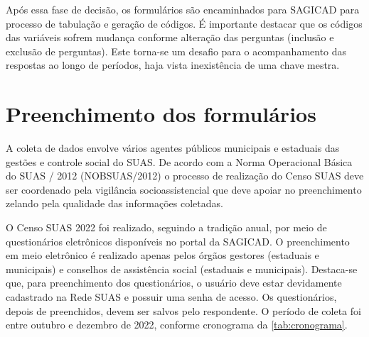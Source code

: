 \documentclass[
  brazilian]{report}
\begin{document}
Após essa fase de decisão, os formulários são encaminhados para SAGICAD
para processo de tabulação e geração de códigos. É importante destacar
que os códigos das variáveis sofrem mudança conforme alteração das
perguntas (inclusão e exclusão de perguntas). Este torna-se um desafio
para o acompanhamento das respostas ao longo de períodos, haja vista
inexistência de uma chave mestra.

\hypertarget{preenchimento-dos-formuluxe1rios}{%
\section{Preenchimento dos
formulários}\label{preenchimento-dos-formuluxe1rios}}

A coleta de dados envolve vários agentes públicos municipais e estaduais
das gestões e controle social do SUAS. De acordo com a Norma Operacional
Básica do SUAS / 2012 (NOBSUAS/2012) o processo de realização do Censo
SUAS deve ser coordenado pela vigilância socioassistencial que deve
apoiar no preenchimento zelando pela qualidade das informações
coletadas.

O Censo SUAS 2022 foi realizado, seguindo a tradição anual, por meio de
questionários eletrônicos disponíveis no portal da SAGICAD. O
preenchimento em meio eletrônico é realizado apenas pelos órgãos
gestores (estaduais e municipais) e conselhos de assistência social
(estaduais e municipais). Destaca-se que, para preenchimento dos
questionários, o usuário deve estar devidamente cadastrado na Rede SUAS
e possuir uma senha de acesso. Os questionários, depois de preenchidos,
devem ser salvos pelo respondente. O período de coleta foi entre outubro
e dezembro de 2022, conforme cronograma da \cref{tab:cronograma}.
\end{document}
